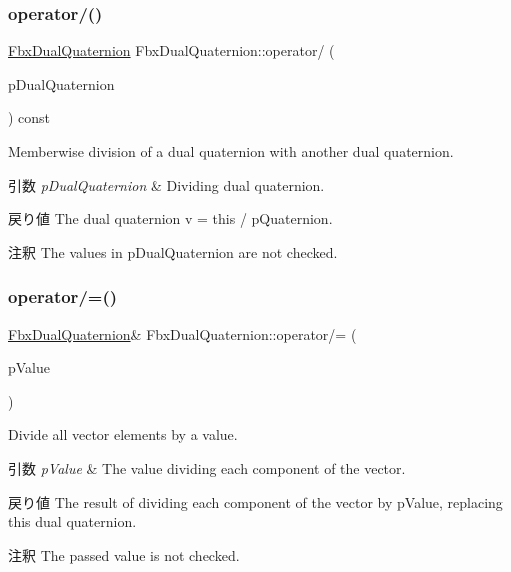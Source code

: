 \subsubsection{\texorpdfstring{operator/()}{operator/()}\hspace{0.1cm}{\footnotesize\ttfamily [2/2]}}
{\footnotesize\ttfamily \hyperlink{class_fbx_dual_quaternion}{Fbx\+Dual\+Quaternion} Fbx\+Dual\+Quaternion\+::operator/ (\begin{DoxyParamCaption}\item[{const \hyperlink{class_fbx_dual_quaternion}{Fbx\+Dual\+Quaternion} \&}]{p\+Dual\+Quaternion }\end{DoxyParamCaption}) const}

Memberwise division of a dual quaternion with another dual quaternion. 
\begin{DoxyParams}{引数}
{\em p\+Dual\+Quaternion} & Dividing dual quaternion. \\
\hline
\end{DoxyParams}
\begin{DoxyReturn}{戻り値}
The dual quaternion v\textquotesingle{} = this / p\+Quaternion. 
\end{DoxyReturn}
\begin{DoxyRemark}{注釈}
The values in p\+Dual\+Quaternion are not checked. 
\end{DoxyRemark}
\mbox{\label{class_fbx_dual_quaternion_acfcd7a62201e9b0f41bf5f1a6bd0d42c}} 
\subsubsection{\texorpdfstring{operator/=()}{operator/=()}\hspace{0.1cm}{\footnotesize\ttfamily [1/2]}}
{\footnotesize\ttfamily \hyperlink{class_fbx_dual_quaternion}{Fbx\+Dual\+Quaternion}\& Fbx\+Dual\+Quaternion\+::operator/= (\begin{DoxyParamCaption}\item[{double}]{p\+Value }\end{DoxyParamCaption})}

Divide all vector elements by a value. 
\begin{DoxyParams}{引数}
{\em p\+Value} & The value dividing each component of the vector. \\
\hline
\end{DoxyParams}
\begin{DoxyReturn}{戻り値}
The result of dividing each component of the vector by p\+Value, replacing this dual quaternion. 
\end{DoxyReturn}
\begin{DoxyRemark}{注釈}
The passed value is not checked. 
\end{DoxyRemark}
\mbox{\label{class_fbx_dual_quaternion_a9fd67ddddaf240850ce7c5fbe801e164}} 
